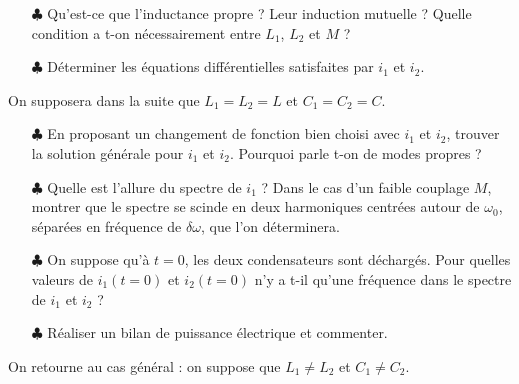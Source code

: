 \documentclass{report}
\begin{document}
\begin{itemize}
	
	\item[$\clubsuit$] Qu'est-ce que l'inductance propre ? Leur induction mutuelle ? Quelle condition a t-on nécessairement entre $L_1$, $L_2$ et $M$ ?
	
	\item[$\clubsuit$] Déterminer les équations différentielles satisfaites par $i_1$ et $i_2$.
	
\end{itemize}

On supposera dans la suite que $L_1=L_2=L$ et $C_1=C_2=C$.

\begin{itemize}	
	
	\item[$\clubsuit$] En proposant un changement de fonction bien choisi avec $i_1$ et $i_2$, trouver la solution générale pour $i_1$ et $i_2$. Pourquoi parle t-on de modes propres ?
	
	\item[$\clubsuit$] Quelle est l'allure du spectre de $i_1$ ? Dans le cas d'un faible couplage $M$, montrer que le spectre se scinde en deux harmoniques centrées autour de $\omega_0$, séparées en fréquence de $\delta\omega$, que l'on déterminera.  
	
	\item[$\clubsuit$] On suppose qu'à $t=0$, les deux condensateurs sont déchargés. Pour quelles valeurs de $i_1(t=0)$ et $i_2(t=0)$ n'y a t-il qu'une fréquence dans le spectre de $i_1$ et $i_2$ ?
	
	\item[$\clubsuit$] Réaliser un bilan de puissance électrique et commenter. 
	
\end{itemize}

On retourne au cas général : on suppose que $L_1\neq L_2$ et $C_1\neq C_2$. 
\end{document}
